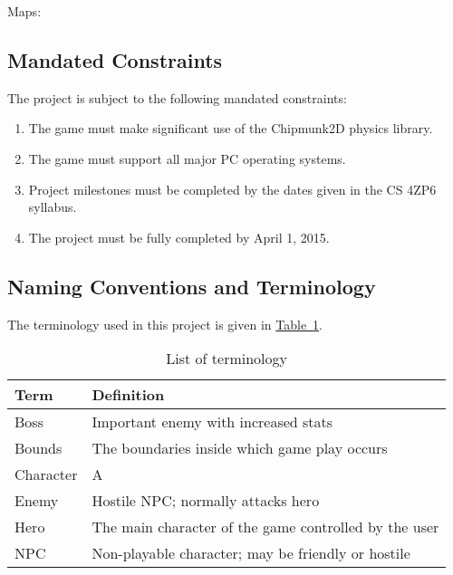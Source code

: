 \documentclass[12pt, titlepage]{article}
\begin{document}
Maps:



\subsection{Mandated Constraints}

The project is subject to the following mandated constraints:

\begin{enumerate}
  \item The game must make significant use of the Chipmunk2D physics library.
  \item The game must support all major PC operating systems.
  \item Project milestones must be completed by the dates given in the CS 4ZP6 syllabus.
  \item The project must be fully completed by April 1, 2015.
\end{enumerate}

\subsection{Naming Conventions and Terminology}
The terminology used in this project is given in \hyperref[tab:terminology]{Table~\ref*{tab:terminology}}.
\begin{table}
\caption{List of terminology} \label{tab:terminology}
\begin{tabularx}{\textwidth}{p{3cm}X}
\toprule {\bf Term} & {\bf Definition}\\
\midrule
Boss & Important enemy with increased stats\\
Bounds & The boundaries inside which game play occurs\\
Character & A\\
Enemy & Hostile NPC; normally attacks hero\\
Hero & The main character of the game controlled by the user\\
NPC & Non-playable character; may be friendly or hostile\\
\bottomrule
\end{tabularx}
\end{table}
\end{document}
